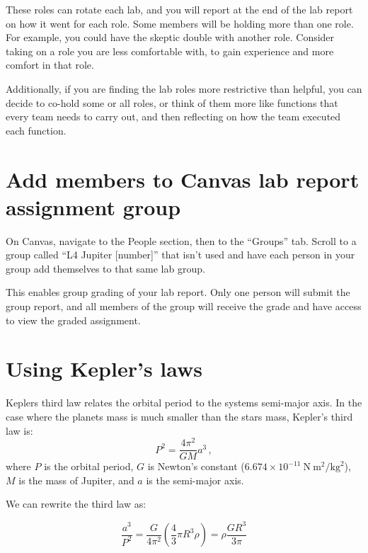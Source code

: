 These roles can rotate each lab, and you will report at the end of the lab report on how it went for each role. Some members will be holding more than one role. For example, you could have the skeptic double with another role. Consider taking on a role you are less comfortable with, to gain experience and more comfort in that role.

Additionally, if you are finding the lab roles more restrictive than helpful, you can decide to co-hold some or all roles, or think of them more like functions that every team needs to carry out, and then reflecting on how the team executed each function.

\section{Add members to Canvas lab report assignment group}

\begin{steps}
	\item On Canvas, navigate to the People section, then to the ``Groups'' tab. Scroll to a group called ``L4 Jupiter [number]'' that isn't used and have each person in your group add themselves to that same lab group.
\end{steps}

This enables group grading of your lab report. Only one person will submit the group report, and all members of the group will receive the grade and have access to view the graded assignment.

\section{Using Kepler's laws}

Keplers third law relates the orbital period to the systems semi-major axis. In the case where the planets mass is much smaller than the stars mass, Kepler's third law is:
\begin{equation}
P^2 = \frac{4\pi^2}{G M}a^3 \,,
\end{equation}
where $P$ is the orbital period, $G$ is Newton's constant ($6.674 \times 10^{-11}\:\textrm{N}\:\textrm{m}^2/\textrm{kg}^2$), $M$ is the mass of Jupiter, and $a$ is the semi-major axis.

We can rewrite the third law as:

\begin{equation}
\frac{a^3}{P^2} = \frac{G}{4\pi^2}\left(\frac{4}{3}\pi R^3\rho \right) = \rho\frac{G R^3}{3\pi}
\end{equation}

